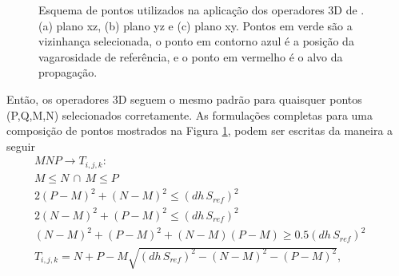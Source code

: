 \begin{figure}[H]
	\centering
	
		
	\caption{Esquema de pontos utilizados na aplicação dos operadores 3D de . (a) plano xz, (b) plano yz e (c) plano xy. Pontos em verde são a vizinhança selecionada, o ponto em contorno azul é a posição da vagarosidade de referência, e o ponto em vermelho é o alvo da propagação.}
	\label{fig:voxel3d}
\end{figure}
\noindent Então, os operadores 3D seguem o mesmo padrão para quaisquer pontos (P,Q,M,N) selecionados corretamente. As formulações completas para uma composição de pontos mostrados na Figura \ref{fig:voxel3d}, podem ser escritas da maneira a seguir
\begin{multline}
	MNP \to T_{i,j,k}: \\ 
	M \le N \,\cap\, M \le P \\
	2(P-M)^2 + (N-M)^2 \le (dh\,S_{ref})^2 \\
	2(N-M)^2 + (P-M)^2 \le (dh\,S_{ref})^2 \\
	(N-M)^2 + (P-M)^2 + (N-M)(P-M) \ge 0.5(dh\,S_{ref})^2 \\
	T_{i,j,k} = N + P - M \sqrt{(dh\,S_{ref})^2 - (N-M)^2 - (P-M)^2}, \,\,\,\,\,\,\,\,\,\,\,\,\,\,\,\,\,\,\,\,\,
	\label{MNP-R}
\end{multline}
